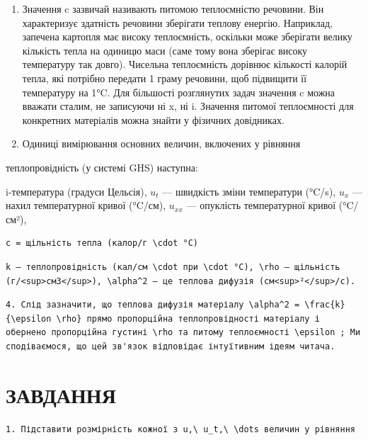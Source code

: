 \documentclass[
  ukrainian,
]{article}
\begin{document}
\begin{enumerate}
\def\labelenumi{\arabic{enumi}.}
\setcounter{enumi}{1}
\item
  Значення c зазвичай називають питомою теплоємністю речовини. Він
  характеризує здатність речовини зберігати теплову енергію. Наприклад,
  запечена картопля має високу теплоємність, оскільки може зберігати
  велику кількість тепла на одиницю маси (саме тому вона зберігає високу
  температуру так довго). Чисельна теплоємність дорівнює кількості
  калорій тепла, які потрібно передати 1 граму речовини, щоб підвищити
  її температуру на 1°C. Для більшості розглянутих задач значення c
  можна вважати сталим, не записуючи ні x, ні i. Значення питомої
  теплоємності для конкретних матеріалів можна знайти у фізичних
  довідниках.
\item
  Одиниці вимірювання основних величин, включених у рівняння
\end{enumerate}

теплопровідність (у системі GHS) наступна:

i-температура (градуси Цельсія), \(u_t\) --- швидкість зміни температури
(°C/s), \(u_x\) --- нахил температурної кривої (°C/см), \(u_{xx}\) ---
опуклість температурної кривої (°C/см²),

\begin{verbatim}
c = щільність тепла (калор/г \cdot °C)
\end{verbatim}

\begin{verbatim}
k — теплопровідність (кал/см \cdot при \cdot °C), \rho — щільність (г/<sup>см3</sup>), \alpha^2 — це теплова дифузія (см<sup>²</sup>/с).
\end{verbatim}

\begin{verbatim}
4. Слід зазначити, що теплова дифузія матеріалу \alpha^2 = \frac{k}{\epsilon \rho} прямо пропорційна теплопровідності матеріалу і обернено пропорційна густині \rho та питому теплоємності \epsilon ; Ми сподіваємося, що цей зв'язок відповідає інтуїтивним ідеям читача.
\end{verbatim}

\section{ЗАВДАННЯ}\label{ux437ux430ux432ux434ux430ux43dux43dux44f-3}

\begin{verbatim}
1. Підставити розмірність кожної з u,\ u_t,\ \dots величин у рівняння
\end{verbatim}
\end{document}
